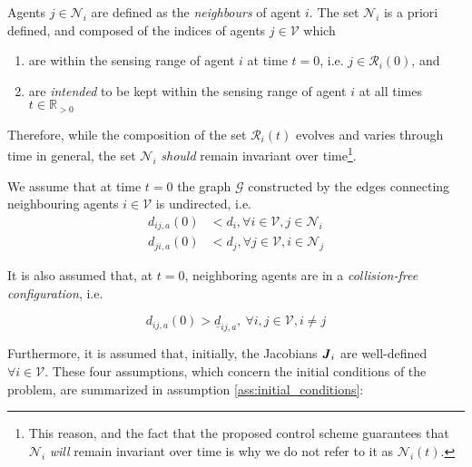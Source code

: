 Agents $j \in \mathcal{N}_i$ are defined as the \textit{neighbours} of
agent $i$. The set $\mathcal{N}_i$ is a priori defined, and composed of the
indices of agents $j \in \mathcal{V}$ which
\begin{enumerate}
  \item are within the sensing range of agent $i$ at time $t=0$, i.e.
    $j \in \mathcal{R}_i(0)$, and
  \item are \textit{intended} to be kept within the sensing range of agent $i$ at all
    times $t \in \mathbb{R}_{> 0}$
\end{enumerate}

Therefore, while the composition of the set $\mathcal{R}_i(t)$ evolves and
varies through time in general, the set $\mathcal{N}_i$ \textit{should} remain
invariant over time\footnote{This reason, and the fact that the proposed
control scheme guarantees that $\mathcal{N}_i$ \textit{will} remain invariant
over time is why we do not refer to it as $\mathcal{N}_i(t)$.}.

We assume that at time $t=0$ the graph $\mathcal{G}$ constructed by the edges
connecting neighbouring agents $i \in \mathcal{V}$ is undirected, i.e.
\begin{subequations}
\begin{align}
  d_{ij,a}(0) &< d_i, \forall i \in \mathcal{V}, j \in \mathcal{N}_i \label{eq:initially_connected_0} \\
  d_{ji,a}(0) &< d_j, \forall j \in \mathcal{V}, i \in \mathcal{N}_j \label{eq:initially_connected_1}
\end{align}
\end{subequations}

It is also assumed that, at $t=0$, neighboring agents are in a
\textit{collision-free configuration}, i.e.

\begin{equation}
   d_{ij,a}(0) > \underline{d}_{ij, a},\ \forall i,j \in \mathcal{V}, i \neq j
\label{eq:initially_coll_free}
\end{equation}

Furthermore, it is assumed that, initially, the Jacobians $\bm{\mathit{J}}_i$ are
well-defined $\forall i \in \mathcal{V}$. These four assumptions, which concern
the initial conditions of the problem, are summarized in assumption
\ref{ass:initial_conditions}:

